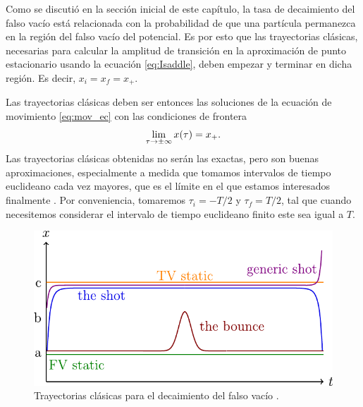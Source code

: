 Como se discutió en la sección inicial de este capítulo, la tasa de decaimiento del falso vacío está relacionada con la probabilidad de que una partícula permanezca en la región del falso vacío del potencial. %
Es por esto que las trayectorias clásicas, necesarias para calcular la amplitud de transición en la aproximación de punto estacionario usando la ecuación \eqref{eq:Isaddle}, deben empezar y terminar en dicha región. Es decir, $x_i = x_f = x_+$. 
%

Las trayectorias clásicas deben ser entonces las soluciones de la ecuación de movimiento \eqref{eq:mov_ec} con las condiciones de frontera \cite{coleman1977fate}
\begin{equation} \label{eq:cond_frontera}
	\lim_{\tau \rightarrow \pm\infty} x\qty(\tau) = x_+.
\end{equation} 
Las trayectorias clásicas obtenidas no serán las exactas, pero son buenas aproximaciones, especialmente a medida que tomamos intervalos de tiempo euclideano cada vez mayores, que es el límite en el que estamos interesados finalmente \cite{paranjape2017theory, callan1977fate}. Por conveniencia, tomaremos $\tau_i = -T/2$ y $\tau_f = T/2$, tal que cuando necesitemos considerar el intervalo de tiempo euclideano finito este sea igual a $T$. 

\begin{figure}[t]
	\centering
	\includegraphics[scale=0.375]{FIGURAS/soluciones}
	\caption{Trayectorias clásicas para el decaimiento del falso vacío \cite{andreassen2017precision}. 
	}
	\label{fig:soluciones}
\end{figure}

